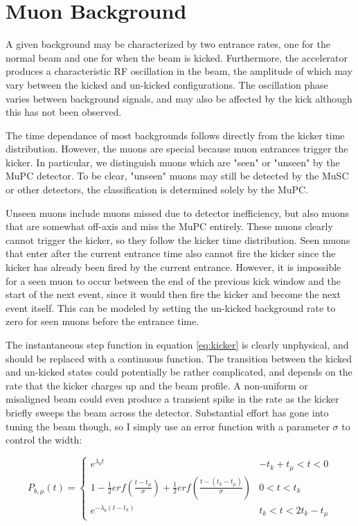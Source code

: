 \section{Muon Background}

A given background may be characterized by two entrance rates, one for the normal beam and one for when the beam is kicked.
Furthermore, the accelerator produces a characteristic RF oscillation in the beam, the amplitude of which may vary between the kicked and un-kicked configurations.
The oscillation phase varies between background signals, and may also be affected by the kick although this has not been observed.

The time dependance of most backgrounds follows directly from the kicker time distribution.
However, the muons are special because muon entrances trigger the kicker.
In particular, we distinguish muons which are "seen" or "unseen" by the MuPC detector.  
To be clear, "unseen" muons may still be detected by the MuSC or other detectors, the classification is determined solely by the MuPC.  

Unseen muons include muons missed due to detector inefficiency, but also muons that are somewhat off-axis and miss the MuPC entirely.
These muons clearly cannot trigger the kicker, so they follow the kicker time distribution.
Seen muons that enter after the current entrance time also cannot fire the kicker since the kicker has already been fired by the current entrance.  
However, it is impossible for a seen muon to occur between the end of the previous kick window and the start of the next event, since it would then fire the kicker and become the next event itself.
This can be modeled by setting the un-kicked background rate to zero for seen muons before the entrance time.

The instantaneous step function in equation \ref{eq:kicker} is clearly unphysical, and should be replaced with a continuous function.  
The transition between the kicked and un-kicked states could potentially be rather complicated, and depends on the rate that the kicker charges up and the beam profile.  
A non-uniform or misaligned beam could even produce a transient spike in the rate as the kicker briefly sweeps the beam across the detector.
Substantial effort has gone into tuning the beam though, so I simply use an error function with a parameter $\sigma$ to control the width:

\begin{equation}
P_{b,\mu}(t) = \begin{cases} e^{\lambda_b t}        & -t_k+t_{\mu}<t<0 \\
                       1 - \frac{1}{2} erf(\frac{t-t_{\mu}}{\sigma}) + \frac{1}{2} erf(\frac{t-(t_k-t_{\mu})}{\sigma}) & 0<t<t_k \\
                       e^{-\lambda_b (t-t_k)}   & t_k<t<2 t_k-t_{\mu} \end{cases}
\label{eq:kicker_muon}
\end{equation}

